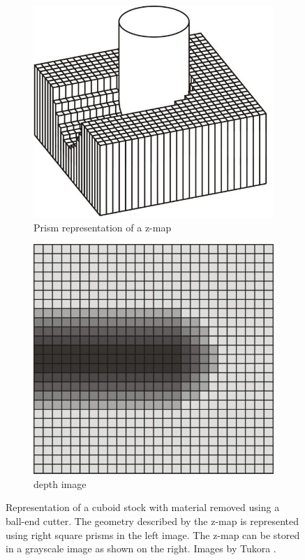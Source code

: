 \begin{description}
	\begin{figure}[h]
		\centering
		\begin{subfigure}{0.4\textwidth}
			\includegraphics[width=\textwidth]{images/zmap}
			\caption{Prism representation of a z-map}
			\label{fig:zmap}
		\end{subfigure}
		\begin{subfigure}{0.4\textwidth}
			\includegraphics[width=\textwidth]{images/depth_image}
			\caption{depth image}
			\label{fig:depth_image}
		\end{subfigure}
		\caption{
			Representation of a cuboid stock with material removed using a ball-end cutter.
			The geometry described by the z-map is represented using right square prisms in the left image.
			The z-map can be stored in a grayscale image as shown on the right.
			Images by Tukora \cite{virtual_machining_review}.
		}
	\end{figure}
	

\end{description}
